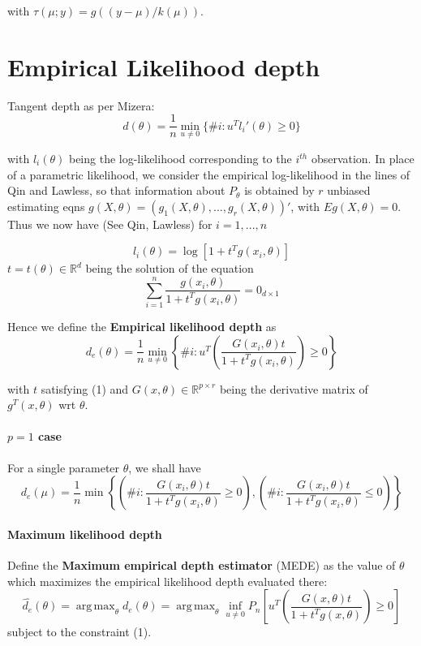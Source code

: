 \documentclass[10pt]{article}
\DeclareMathOperator*{\argmax}{arg\,max}
\begin{document}
with $\tau(\mu;y) = g((y-\mu)/k(\mu))$.

\section{Empirical Likelihood depth}
Tangent depth as per Mizera:
$$ d(\theta) = \frac{1}{n}\min_{u\neq 0} \{\# i: u^Tl_i'(\theta)\geq 0\} $$

with $l_i(\theta)$ being the log-likelihood corresponding to the $i^{th}$ observation. In place of a parametric likelihood, we consider the empirical log-likelihood in the lines of Qin and Lawless, so that information about $P_\theta$ is obtained by $r$ unbiased estimating eqns $g(X,\theta) = (g_1(X,\theta),...,g_r(X,\theta))'$, with $Eg(X,\theta)=0$. Thus we now have (See Qin, Lawless) for $i=1,...,n$

$$ l_i(\theta) = \log\left[1+t^Tg(x_i,\theta)\right] $$
$t = t(\theta)\in\mathbb R^d$ being the solution of the equation
\begin{equation}
\sum_{i=1}^n \frac{g(x_i,\theta)}{1+t^Tg(x_i,\theta)} = 0_{d\times 1}
\end{equation}

Hence we define the \textbf{Empirical likelihood depth} as
$$d_e(\theta) = \frac{1}{n}\min_{u\neq 0} \left\{\#i:u^T\left(\frac{G(x_i,\theta)t}{1+t^Tg(x_i,\theta)}\right)\geq 0\right\}$$

with $t$ satisfying (1) and $G(x,\theta)\in\mathbb{R}^{p\times r}$ being the derivative matrix of $g^T(x,\theta)$ wrt $\theta$.

\paragraph{$p=1$ case} For a single parameter $\theta$, we shall have
$$ d_e(\mu) = \frac{1}{n} \min\left\{ \left(\#i:\frac{G(x_i,\theta)t}{1+t^Tg(x_i,\theta)}\geq 0\right),
\left(\#i:\frac{G(x_i,\theta)t}{1+t^Tg(x_i,\theta)}\leq 0\right) \right\} $$

\paragraph{Maximum likelihood depth} Define the \textbf{Maximum empirical depth estimator} (MEDE) as the value of $\theta$ which maximizes the empirical likelihood depth evaluated there:
$$ \hat{d_e}(\theta) = \argmax_\theta d_e(\theta) = \argmax_\theta \inf_{u\neq 0} P_n\left[u^T\left(\frac{G(x,\theta)t}{1+t^Tg(x,\theta)}\right)\geq 0\right]$$
subject to the constraint (1).
\end{document}
